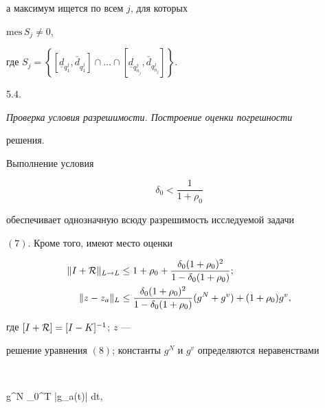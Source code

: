 а максимум ищется по всем $j$, для которых


$\mathrm {mes}\,S_j\ne 0$,


где $S_j=


\left\{ [ \underline d_{q^j_1}, \bar d_{q^j_1}] \cap \dotsc


\cap [ \underline d_{q^j_{n_j}}, \bar d_{q^j_{n_j}}]


\right\}$.





5.4. {\it Проверка условия разрешимости. Построение оценки погрешности


решения.} Выполнение условия


%


\begin{equation}


\delta_0 < \frac {1}{1+\rho_0}


\end{equation}


%


обеспечивает однозначную всюду разрешимость исследуемой задачи


$(7)$. Кроме того, имеют место оценки


%


\begin{align}


\begin{split}


\| I+{\cal R} \|_{L\to L} & \le 1 + \rho_0 + \frac {\delta_0


(1+\rho_0)^2} {1-\delta_0 (1+\rho_0)}; \\


%


\| z -z_a\|_L & \le \frac {\delta_0 (1+\rho_0)^2}


{1 - \delta_0 (1+\rho_0 )}


(g^N + g^v) + (1+\rho_0)g^v,


\end{split}


\end{align}


%


где $[I+{\cal R}] = [I-K]^{-1}$; $z$ ---


решение уравнения $(8)$; константы $g^N$ и $g^v$ определяются неравенствами


%


$$


g^N \ge \int_0^T |g_a(t)| dt, \qquad


